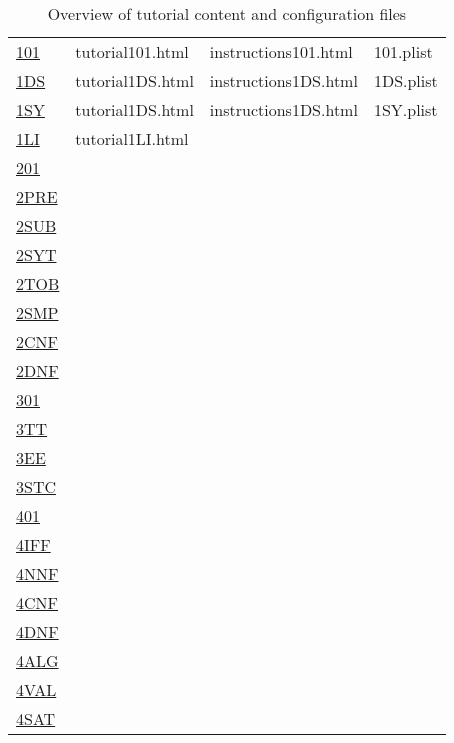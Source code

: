 \begin{table}[htdp]
\begin{center}
\begin{tabular}{llll}
\hyperref[tut:101]{101} & tutorial101.html & instructions101.html & 101.plist \\
\hyperref[tut:1DS]{1DS} & tutorial1DS.html & instructions1DS.html & 1DS.plist \\
\hyperref[tut:1SY]{1SY} & tutorial1DS.html & instructions1DS.html & 1SY.plist \\
\hyperref[tut:1LI]{1LI} & tutorial1LI.html & & \\
\hline
\hyperref[tut:201]{201} & \\
\hyperref[tut:2PRE]{2PRE} & \\
\hyperref[tut:2SUB]{2SUB} & \\
\hyperref[tut:2SYT]{2SYT} & \\
\hyperref[tut:2TOB]{2TOB} & \\
\hyperref[tut:2SMP]{2SMP} & \\
\hyperref[tut:2CNF]{2CNF} & \\
\hyperref[tut:2DNF]{2DNF} & \\
\hline
\hyperref[tut:301]{301} & \\
\hyperref[tut:3TT]{3TT} & \\
\hyperref[tut:3EE]{3EE} & \\
\hyperref[tut:3STC]{3STC} & \\
\hline
\hyperref[tut:401]{401} & \\
\hyperref[tut:4IFF]{4IFF} & \\
\hyperref[tut:4NNF]{4NNF} & \\
\hyperref[tut:4CNF]{4CNF} & \\
\hyperref[tut:4DNF]{4DNF} & \\
\hyperref[tut:4ALG]{4ALG} & \\
\hyperref[tut:4VAL]{4VAL} & \\
\hyperref[tut:4SAT]{4SAT} & \\
\hline
\end{tabular}
\caption{Overview of tutorial content and configuration files}
\end{center}
\label{tab:CONFIG}
\end{table}%



